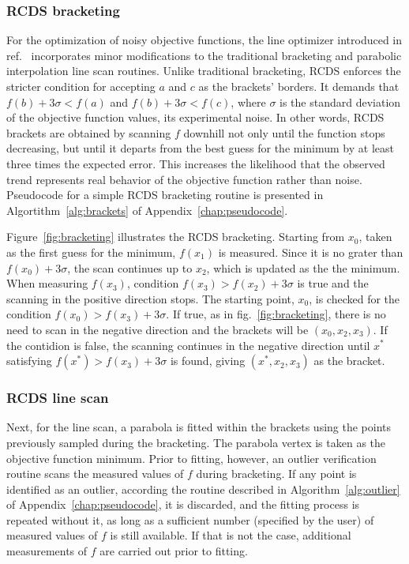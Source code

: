 \subsubsection{RCDS bracketing}
For the optimization of noisy objective functions, the line optimizer introduced in ref.~\cite{huang_algorithm_2013} incorporates minor modifications to the traditional bracketing and parabolic interpolation line scan routines. Unlike traditional bracketing, RCDS enforces the stricter condition for accepting $a$ and $c$ as the brackets' borders. It demands that $f(b) + 3\sigma < f(a)$ and $f(b) + 3\sigma < f(c)$, where $\sigma$ is the standard deviation of the objective function values, its experimental noise. In other words, RCDS brackets are obtained by scanning $f$ downhill not only until the function stops decreasing, but until it departs from the best guess for the minimum by at least three times the expected error. This increases the likelihood that the observed trend represents real behavior of the objective function rather than noise. Pseudocode for a simple RCDS bracketing routine is presented in Algortithm~\ref{alg:brackets} of Appendix~\ref{chap:pseudocode}.

Figure~\ref{fig:bracketing} illustrates the RCDS bracketing. Starting from $x_0$, taken as the first guess for the minimum, $f(x_1)$ is measured. Since it is no grater than $f(x_0)+3\sigma$, the scan continues up to $x_2$, which is updated as the the minimum. When measuring $f(x_3)$, condition $f(x_3) > f(x_2) + 3\sigma$ is true and the scanning in the positive direction stops. The starting point, $x_0$, is checked for the condition $f(x_0)>f(x_3)+3\sigma$. If true, as in fig.~\ref{fig:bracketing}, there is no need to scan in the negative direction and the brackets will be $(x_0, x_2, x_3)$. If the contidion is false, the scanning continues in the negative direction until $x^*$ satisfying $f(x^*)>f(x_3)+3\sigma$ is found, giving $(x^*, x_2, x_3)$ as the bracket.

\subsubsection{RCDS line scan}
Next, for the line scan, a parabola is fitted within the brackets using the points previously sampled during the bracketing. The parabola vertex is taken as the objective function minimum. Prior to fitting, however, an outlier verification routine scans the measured values of $f$ during bracketing. If any point is identified as an outlier, according the routine described in Algorithm~\ref{alg:outlier} of Appendix~\ref{chap:pseudocode}, it is discarded, and the fitting process is repeated without it, as long as a sufficient number (specified by the user) of measured values of $f$ is still available. If that is not the case, additional measurements of $f$ are carried out prior to fitting.

